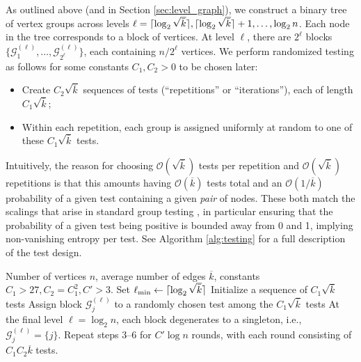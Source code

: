\documentclass[journal]{IEEEtran}
\theoremstyle{definition}
\theoremstyle{definition}
\newcommand{\Gc}{\mathcal{G}}
\newcommand{\kb}{\overline{k}}
\DeclarePairedDelimiter\ceil{\lceil}{\rceil}
\newcommand{\bigO}{\mathcal{O}}
\begin{document}
As outlined above (and in Section \ref{sec:level_graph}), we construct a binary tree of vertex groups across levels \( \ell = \ceil{\log_2 \sqrt{\bar{k}}}, \ceil{\log_2 \sqrt{\bar{k}}} + 1, \dotsc, \log_2 n \). Each node in the tree corresponds to a block of vertices. At level \( \ell \), there are \( 2^{\ell} \) blocks \( \{\Gc^{(\ell)}_1, \dotsc, \Gc^{(\ell)}_{2^{\ell}}\} \), each containing \( n/2^{\ell} \) vertices.  We perform randomized testing as follows for some constants \( C_1, C_2 > 0 \) to be chosen later:
\begin{itemize}
    \item Create \( C_2 \sqrt{\kb} \) sequences of tests (``repetitions'' or ``iterations''), each of length \( C_1 \sqrt{\kb} \);
    \item Within each repetition, each group is assigned uniformly at random to one of these \( C_1 \sqrt{\kb} \) tests.
\end{itemize}
Intuitively, the reason for choosing $\bigO(\sqrt{\kb})$ tests per repetition and $\bigO(\sqrt{\kb})$ repetitions is that this amounts having $\bigO(\kb)$ tests total and an $\bigO(1/\kb)$ probability of a given test containing a given \emph{pair} of nodes.  These both match the scalings that arise in standard group testing \cite{price2020fast}, in particular ensuring that the probability of a given test being positive is bounded away from 0 and 1, implying non-vanishing entropy per test.  See Algorithm \ref{alg:testing} for a full description of the test design.


\begin{algorithm*}[t]
	\caption{Testing Procedure}
	\label{alg:testing}
	\begin{algorithmic}[1]
		\REQUIRE Number of vertices \( n \), average number of edges \( \kb \), constants $C_1>27,C_2 = C_1^2,C'>3$.
		\STATE Set \( \ell_{\min} \gets \ceil{\log_2 \sqrt{\bar{k}}} \)
		\FOR{each iteration in \( \{1, \dotsc, C_2 \sqrt{\kb}\} \)} %
		\STATE Initialize a sequence of $C_1 \sqrt{\kb}$ tests
		\STATE Assign block \( \Gc^{(\ell)}_j \) to a randomly chosen test among the $C_1 \sqrt{\kb}$ tests
		\ENDFOR
		\ENDFOR
		\ENDFOR
		\STATE At the final level $\ell = \log_2 n$, each block degenerates to a singleton, i.e., $\Gc_{j}^{(\ell)} = \{j\}$. Repeat steps 3--6 for $C' \log n$ rounds, with each round consisting of $C_1 C_2 \kb$ tests.
	\end{algorithmic}
\end{algorithm*}
\end{document}
